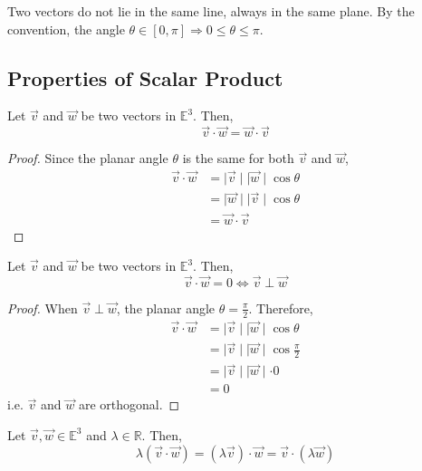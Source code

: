 \begin{note}
  Two vectors do not lie in the same line, always in the same plane.
  By the convention, the angle $\theta \in [0,\pi] \Rightarrow 0 \leq \theta \leq \pi$.
\end{note}

\subsection{Properties of Scalar Product}
\begin{theorem}[Commutative]
Let $\vec{v}$ and $\vec{w}$ be two vectors in $\mathbb{E}^3$. Then,
  \begin{equation}
    \vec{v} \cdot \vec{w} = \vec{w} \cdot \vec{v}
  \end{equation}
\end{theorem}
\begin{proof}
Since the planar angle $\theta$ is the same for both $\vec{v}$ and $\vec{w}$,
\begin{align*}
  \vec{v} \cdot \vec{w} &= \mid \vec{v} \mid \mid \vec{w} \mid \cos \theta \\
  &= \mid \vec{w} \mid \mid \vec{v} \mid \cos \theta \\
  &= \vec{w} \cdot \vec{v}  
\end{align*}
\end{proof}
\begin{theorem}
 Let $\vec{v}$ and $\vec{w}$ be two vectors in $\mathbb{E}^3$. Then,
  \begin{equation}
    \vec{v} \cdot \vec{w} = 0 \iff \vec{v} \perp \vec{w}
  \end{equation} 
\end{theorem}
\begin{proof}
When $\vec{v} \perp \vec{w}$, the planar angle $\theta = \frac{\pi}{2}$. 
Therefore, 
\begin{align*}
  \vec{v} \cdot \vec{w} &= \mid \vec{v} \mid \mid \vec{w} \mid \cos \theta \\
  &= \mid \vec{v} \mid \mid \vec{w} \mid \cos \frac{\pi}{2} \\
  &= \mid \vec{v} \mid \mid \vec{w} \mid \cdot 0 \\
  &= 0
\end{align*}
  i.e. $\vec{v}$ and $\vec{w}$ are orthogonal.
\end{proof}

\begin{theorem}
  Let $\vec{v}, \vec{w} \in \mathbb{E}^3$ and $\lambda \in \mathbb{R}$. Then,
  \begin{equation}
    \lambda(\vec{v} \cdot \vec{w}) = (\lambda \vec{v}) \cdot \vec{w} = \vec{v} \cdot (\lambda \vec{w})
  \end{equation}
\end{theorem}

